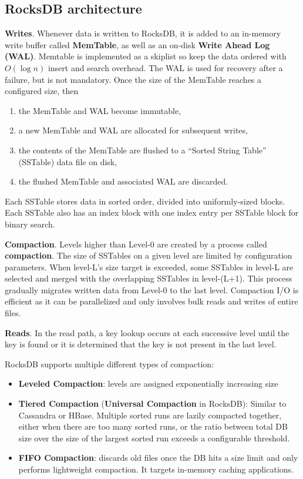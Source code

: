\documentclass[11pt]{article}
\begin{document}
\subsection{RocksDB architecture}
\label{sec:orgc2f5fad}
\textbf{Writes}. Whenever data is written to RocksDB, it is added to an in-memory write buffer called \textbf{MemTable}, as well as an
on-disk \textbf{Write Ahead Log (WAL)}. Memtable is implemented as a skiplist so keep the data ordered with \(O(\log n)\) insert and
search overhead. The WAL is used for recovery after a failure, but is not mandatory. Once the size of the MemTable reaches
a configured size, then
\begin{enumerate}
\item the MemTable and WAL become immutable,
\item a new MemTable and WAL are allocated for subsequent writes,
\item the contents of the MemTable are flushed to a “Sorted String Table” (SSTable) data file on disk,
\item the flushed MemTable and associated WAL are discarded.
\end{enumerate}
Each SSTable stores data in sorted order, divided into uniformly-sized blocks. Each SSTable also has an index block
with one index entry per SSTable block for binary search.

\textbf{Compaction}. Levels higher than Level-0 are created by a process called \textbf{compaction}. The size of
SSTables on a given level are limited by configuration parameters. When level-L’s size target is exceeded, some
SSTables in level-L are selected and merged with the overlapping SSTables in level-(L+1). This process
gradually migrates written data from Level-0 to the last level. Compaction I/O is efficient as it can
be parallelized and only involves bulk reads and writes of entire files.

\textbf{Reads}. In the read path, a key lookup occurs at each successive level until the key is found or it is
determined that the key is not present in the last level.

RocksDB supports multiple different types of compaction:
\begin{itemize}
\item \textbf{Leveled Compaction}: levels are assigned exponentially increasing size
\item \textbf{Tiered Compaction} (\textbf{Universal Compaction} in RocksDB): Similar to Cassandra or HBase. Multiple sorted runs are lazily compacted
together, either when there are too many sorted runs, or the ratio between total DB size over the
size of the largest sorted run exceeds a configurable threshold.
\item \textbf{FIFO Compaction}: discards old files once the DB hits a size limit and only performs lightweight
compaction. It targets in-memory caching applications.
\end{itemize}
\end{document}
